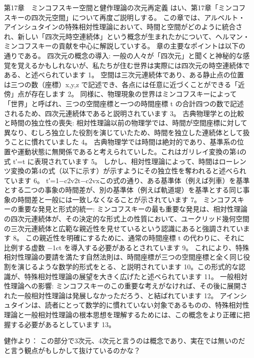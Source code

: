 \documentclass{article}
\begin{document}
第17章　ミンコフスキー空間と健作理論の次元再定義
はい、第17章「ミンコフスキーの四次元空間」について再度ご説明しする。
この章では、アルベルト・アインシュタインの特殊相対性理論において、時間と空間がどのように統合され、新しい「四次元時空連続体」という概念が生まれたかについて、ヘルマン・ミンコフスキーの貢献を中心に解説していする。
章の主要なポイントは以下の通りである。
四次元の概念の導入:
一般の人々が「四次元」と聞くと神秘的な感覚を覚えるかもしれないが、私たちが住む世界は実際には四次元の時空連続体である、と述べられています 1。
空間は三次元連続体であり、ある静止点の位置は三つの数（座標）x,y,z で記述でき、各点には任意に近づくことができる「近傍」点が存在します 2。
同様に、物理現象の世界はミンコフスキーによって「世界」と呼ばれ、三つの空間座標と一つの時間座標 t の合計四つの数で記述されるため、四次元連続体であると説明されています 3。
古典物理学との比較と時間の独立性の喪失:
相対性理論以前の物理学では、時間が空間座標に対して異なり、むしろ独立した役割を演じていたため、時間を独立した連続体として扱うことに慣れていました 4。
古典物理学では時間は絶対的であり、基準系の位置や運動状態に無関係であると考えられていした。これはガリレイ変換の第4の式 t′=t に表現されています 5。
しかし、相対性理論によって、時間はローレンツ変換の第4の式（以下に示す）が示すようにその独立性を奪われると述べられています 6。 t′=1−c2v2​​t−c2v​x​
この式の通り、ある基準体（例えば列車）を基準とする二つの事象の時間差が、別の基準体（例えば軌道堤）を基準とする同じ事象の時間差と一般には一致しなくなることが示されています 7。
ミンコフスキーの重要な発見と形式的統一:
ミンコフスキーの最も重要な発見は、相対性理論の四次元連続体が、その決定的な形式上の性質において、ユークリッド幾何空間の三次元連続体と広範な親近性を見せているという認識にあると強調されています 8。
この親近性を明確にするために、通常の時間座標 t の代わりに、それに比例する虚数 −1​ct を導入する必要があるとされています 9。
これにより、特殊相対性理論の要請を満たす自然法則は、時間座標が三つの空間座標と全く同じ役割を演じるような数学的形式をとる、と説明されています 10。この形式的な認識が、特殊相対性理論の展望を大きく広げたと述べられています 11。
一般相対性理論への影響:
ミンコフスキーのこの重要な考えがなければ、その後に展開された一般相対性理論は発展しなかっただろう、と結ばれています 12。
アインシュタインは、読者にとって数学的に慣れていない対象であるものの、特殊相対性理論と一般相対性理論の根本思想を理解するためには、この概念をより正確に把握する必要があるとしています 13。

健作より：
この部分で3次元、4次元と言うのは概念であり、実在では無いのだと言う観点がもしかして抜けているのかな？
\end{document}
